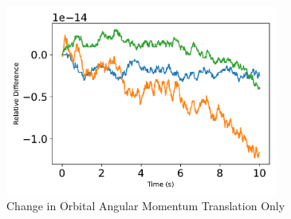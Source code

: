 \begin{figure}[htbp]\centerline{\includegraphics[width=0.8\textwidth]{AutoTeX/scPlusChangeInOrbitalAngularMomentumTranslationOnly}}\caption{Change in Orbital Angular Momentum Translation Only}\label{fig:scPlusChangeInOrbitalAngularMomentumTranslationOnly}\end{figure}